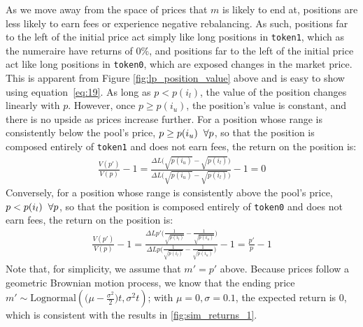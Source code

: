 \documentclass[11pt]{article}
\begin{document}
As we move away from the space of prices that $m$ is likely to end at, positions are less likely to earn fees or experience negative rebalancing. As such, positions far to the left of the initial price act simply like long positions in \texttt{token1}, which as the numeraire have returns of 0\%, and positions far to the left of the initial price act like long positions in \texttt{token0}, which are exposed changes in the market price. This is apparent from Figure \ref{fig:lp_position_value} above and is easy to show using equation~\eqref{eq:19}. As long as $p < p(i_l)$, the value of the position changes linearly with $p$. However, once $p \ge p(i_u)$, the position's value is constant, and there is no upside as prices increase further. For a position whose range is consistently below the pool's price, $p \ge p(i_u) \hspace{0.2cm} \forall p$, so that the position is composed entirely of \texttt{token1} and does not earn fees, the return on the position is:
\begin{gather}
    \frac{V(p')}{V(p)} - 1 = \frac{\Delta L \big( \sqrt{p(i_u)} - \sqrt{p(i_l)} \big)}{\Delta L \big( \sqrt{p(i_u)} - \sqrt{p(i_l)} \big)} - 1 = 0 \label{eq:22}
\end{gather}
Conversely, for a position whose range is consistently above the pool's price, $p < p(i_l) \hspace{0.2cm} \forall p$, so that the position is composed entirely of \texttt{token0} and does not earn fees, the return on the position is:
\begin{gather}
    \frac{V(p')}{V(p)} - 1 = \frac{\Delta L p' \bigg( \frac{1}{\sqrt{p(i_l)}} - \frac{1}{\sqrt{p(i_u)}} \bigg)}{\Delta L p \bigg( \frac{1}{\sqrt{p(i_l)}} - \frac{1}{\sqrt{p(i_u)}} \bigg)} - 1 = \frac{p'}{p} - 1 \label{eq:23}
\end{gather}
Note that, for simplicity, we assume that $m' = p'$ above. Because prices follow a geometric Brownian motion process, we know that the ending price $m' \sim \text{Lognormal}(\bigl(\mu - \frac{\sigma^2}{2} \bigl) t, \sigma^2 t)$; with $\mu=0, \sigma=0.1$, the expected return is 0, which is consistent with the results in \ref{fig:sim_returns_1}.
\end{document}
